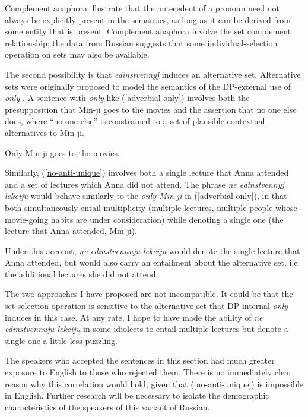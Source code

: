 Complement anaphora illustrate that the antecedent of a pronoun need not always be explicitly present in the semantics, as long as it can be derived from some entity that is present. Complement anaphora involve the set complement relationship; the data from Russian suggests that some individual-selection operation on sets may also be available.

The second possibility is that \textit{edinstvennyj} induces an alternative set. Alternative sets were originally proposed to model the semantics of the DP-external use of \textit{only} \citep{rooth85, rooth92}.
A sentence with \textit{only} like (\ref{adverbial-only}) involves both the presupposition that Min-ji goes to the movies and the assertion that no one else does, where ``no one else'' is constrained to a set of plausible contextual alternatives to Min-ji.

\begin{exe}
	\ex \label{adverbial-only} Only Min-ji goes to the movies.
\end{exe}

Similarly, (\ref{no-anti-unique}) involves both a single lecture that Anna attended and a set of lectures which Anna did not attend. The phrase \textit{ne edinstvennyj lekciju} would behave similarly to the \textit{only Min-ji} in (\ref{adverbial-only}), in that both simultaneously entail multiplicity (multiple lectures, multiple people whose movie-going habits are under consideration) while denoting a single one (the lecture that Anna attended, Min-ji).

Under this account, \textit{ne edinstvennuju lekciju} would denote the single lecture that Anna attended, but would also carry an entailment about the alternative set, i.e. the additional lectures she did not attend.

The two approaches I have proposed are not incompatible. It could be that the set selection operation is sensitive to the alternative set that DP-internal \textit{only} induces in this case. At any rate, I hope to have made the ability of \textit{ne edinstvennuju lekciju} in some idiolects to entail multiple lectures but denote a single one a little less puzzling.

The speakers who accepted the sentences in this section had much greater exposure to English to those who rejected them. There is no immediately clear reason why this correlation would hold, given that (\ref{no-anti-unique}) is impossible in English. Further research will be necessary to isolate the demographic characteristics of the speakers of this variant of Russian.
